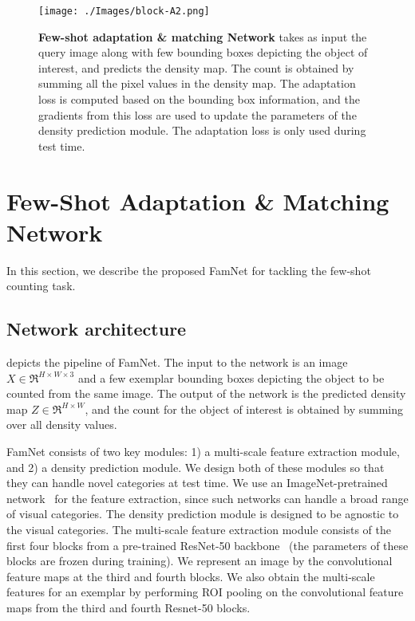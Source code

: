 \begin{figure*}[t]
    \texttt{[image: ./Images/block-A2.png]}
    \caption{{\bf Few-shot adaptation \& matching Network} takes as input the query image along with few bounding boxes depicting the object of interest, and predicts the density map. The count is obtained by summing all the pixel values in the density map. The adaptation loss is computed based on the bounding box information, and the gradients from this loss are used to update the parameters of the density prediction module. The adaptation loss is only used during test time. 
  \label{fig:EmNet}}
 \end{figure*}  
\section{Few-Shot Adaptation \& Matching Network}

In this section, we describe the proposed FamNet for tackling the few-shot counting task. 

\subsection{Network architecture}

 depicts the pipeline of FamNet. The input to the network is an image $X \in \Re^{H \times W \times 3}$ and a few exemplar bounding boxes depicting the object to be counted from the same image. The output of the network is the predicted density map $Z \in \Re^{H \times W}$, and the count for the object of interest is obtained by summing over all density values. 
 
FamNet consists of two key modules: 1) a multi-scale feature extraction module, and 2) a density prediction module. We design both of these modules so that they can handle novel categories at test time. We use an ImageNet-pretrained network~\cite{He-et-al-CVPR16} for the feature extraction, since such networks can handle a broad range of visual categories. The density prediction module is designed to be agnostic to the visual categories.
The multi-scale feature extraction module consists of the first four blocks from a pre-trained ResNet-50 backbone~\cite{He-et-al-CVPR16} (the parameters of these blocks are frozen during training). We represent an image by the convolutional feature maps at the third and fourth blocks. We also obtain the multi-scale features for an exemplar by performing ROI pooling on the convolutional feature maps from the third and fourth Resnet-50 blocks.

